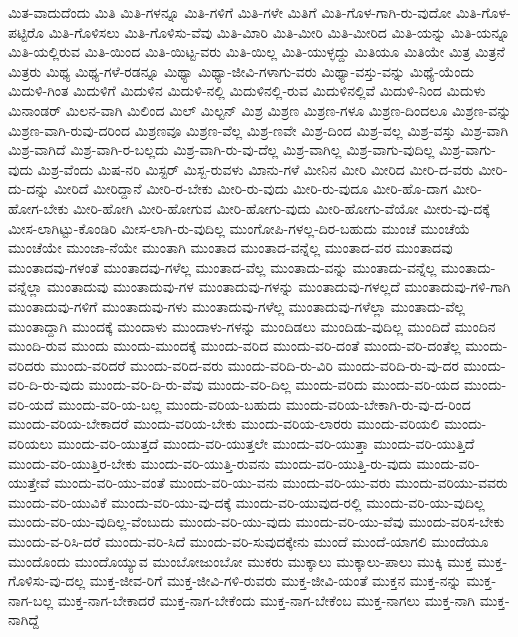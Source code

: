 {ಮಿತ-ವಾದುದೆಂದು
ಮಿತಿ
ಮಿತಿ-ಗಳನ್ನೂ
ಮಿತಿ-ಗಳಿಗೆ
ಮಿತಿ-ಗಳೇ
ಮಿತಿಗೆ
ಮಿತಿ-ಗೊಳ-ಗಾಗಿ-ರು-ವುದೋ
ಮಿತಿ-ಗೊಳ-ಪಟ್ಟಿರೊ
ಮಿತಿ-ಗೊಳಿಸಲು
ಮಿತಿ-ಗೊಳಿಸು-ವೆವು
ಮಿತಿ-ಮಿಾರಿ
ಮಿತಿ-ಮೀರಿ
ಮಿತಿ-ಮೀರಿದ
ಮಿತಿ-ಯನ್ನು
ಮಿತಿ-ಯನ್ನೂ
ಮಿತಿ-ಯಲ್ಲಿರುವ
ಮಿತಿ-ಯಿಂದ
ಮಿತಿ-ಯಿಟ್ಟ-ವರು
ಮಿತಿ-ಯಿಲ್ಲ
ಮಿತಿ-ಯುಳ್ಳದ್ದು
ಮಿತಿಯೂ
ಮಿತಿಯೇ
ಮಿತ್ರ
ಮಿತ್ರನೆ
ಮಿತ್ರರು
ಮಿಥ್ಯ
ಮಿಥ್ಯ-ಗಳೆ-ರಡನ್ನೂ
ಮಿಥ್ಯಾ
ಮಿಥ್ಯಾ-ಜೀವಿ-ಗಳಾಗು-ವರು
ಮಿಥ್ಯಾ-ವಸ್ತು-ವನ್ನು
ಮಿಥ್ಯೆ-ಯೆಂದು
ಮಿದುಳಿ-ಗಿಂತ
ಮಿದುಳಿಗೆ
ಮಿದುಳಿನ
ಮಿದುಳಿ-ನಲ್ಲಿ
ಮಿದುಳಿನಲ್ಲಿ-ರುವ
ಮಿದುಳಿನಲ್ಲಿವೆ
ಮಿದುಳಿ-ನಿಂದ
ಮಿದುಳು
ಮಿನಾಂಡರ್
ಮಿಲನ-ವಾಗಿ
ಮಿಲಿಂದ
ಮಿಲ್
ಮಿಲ್ಟನ್
ಮಿಶ್ರ
ಮಿಶ್ರಣ
ಮಿಶ್ರಣ-ಗಳೂ
ಮಿಶ್ರಣ-ದಿಂದಲೂ
ಮಿಶ್ರಣ-ವನ್ನು
ಮಿಶ್ರಣ-ವಾಗಿ-ರುವು-ದರಿಂದ
ಮಿಶ್ರಣವೂ
ಮಿಶ್ರಣ-ವೆಲ್ಲ
ಮಿಶ್ರ-ಣವೇ
ಮಿಶ್ರ-ದಿಂದ
ಮಿಶ್ರ-ವಲ್ಲ
ಮಿಶ್ರ-ವಸ್ತು
ಮಿಶ್ರ-ವಾಗಿ
ಮಿಶ್ರ-ವಾಗಿದೆ
ಮಿಶ್ರ-ವಾಗಿ-ರ-ಬಲ್ಲದು
ಮಿಶ್ರ-ವಾಗಿ-ರು-ವು-ದೆಲ್ಲ
ಮಿಶ್ರ-ವಾಗಿಲ್ಲ
ಮಿಶ್ರ-ವಾಗು-ವುದಿಲ್ಲ
ಮಿಶ್ರ-ವಾಗು-ವುದು
ಮಿಶ್ರ-ವೆಂದು
ಮಿಷ-ನರಿ
ಮಿಸ್ಟರ್
ಮಿಸ್ಬ-ರುವಳು
ಮಿಾನು-ಗಳೆ
ಮೀನಿನ
ಮೀರಿ
ಮೀರಿದ
ಮೀರಿ-ದ-ವರು
ಮೀರಿ-ದು-ದನ್ನು
ಮೀರಿದೆ
ಮೀರಿದ್ದಾನೆ
ಮೀರಿ-ರ-ಬೇಕು
ಮೀರಿ-ರು-ವುದು
ಮೀರಿ-ರು-ವುದೂ
ಮೀರಿ-ಹೊ-ದಾಗ
ಮೀರಿ-ಹೋಗ-ಬೇಕು
ಮೀರಿ-ಹೋಗಿ
ಮೀರಿ-ಹೋಗುವ
ಮೀರಿ-ಹೋಗು-ವುದು
ಮೀರಿ-ಹೋಗು-ವೆಯೋ
ಮೀರು-ವು-ದಕ್ಕೆ
ಮೀಸ-ಲಾಗಿಟ್ಟು-ಕೊಂಡಿರಿ
ಮೀಸ-ಲಾಗಿ-ರು-ವುದಿಲ್ಲ
ಮುಂಗೋಪಿ-ಗಳಲ್ಲ-ದಿರ-ಬಹುದು
ಮುಂಚೆ
ಮುಂಚೆಯೆ
ಮುಂಚೆಯೇ
ಮುಂಜಾ-ನೆಯೇ
ಮುಂತಾಗಿ
ಮುಂತಾದ
ಮುಂತಾದ-ವನ್ನೆಲ್ಲ
ಮುಂತಾದ-ವರ
ಮುಂತಾದವು
ಮುಂತಾದವು-ಗಳಂತೆ
ಮುಂತಾದವು-ಗಳೆಲ್ಲ
ಮುಂತಾದ-ವೆಲ್ಲ
ಮುಂತಾದು-ವನ್ನು
ಮುಂತಾದು-ವನ್ನೆಲ್ಲ
ಮುಂತಾದು-ವನ್ನೆಲ್ಲಾ
ಮುಂತಾದುವು
ಮುಂತಾದುವು-ಗಳ
ಮುಂತಾದುವು-ಗಳನ್ನು
ಮುಂತಾದುವು-ಗಳಲ್ಲದೆ
ಮುಂತಾದುವು-ಗಳಿ-ಗಾಗಿ
ಮುಂತಾದುವು-ಗಳಿಗೆ
ಮುಂತಾದುವು-ಗಳು
ಮುಂತಾದುವು-ಗಳೆಲ್ಲ
ಮುಂತಾದುವು-ಗಳೆಲ್ಲಾ
ಮುಂತಾದು-ವೆಲ್ಲ
ಮುಂತಾದ್ದಾಗಿ
ಮುಂದಕ್ಕೆ
ಮುಂದಾಳು
ಮುಂದಾಳು-ಗಳನ್ನು
ಮುಂದಿಡಲು
ಮುಂದಿಡು-ವುದಿಲ್ಲ
ಮುಂದಿದೆ
ಮುಂದಿನ
ಮುಂದಿ-ರುವ
ಮುಂದು
ಮುಂದು-ಮುಂದಕ್ಕೆ
ಮುಂದು-ವರಿದ
ಮುಂದು-ವರಿ-ದಂತೆ
ಮುಂದು-ವರಿ-ದಂತೆಲ್ಲ
ಮುಂದು-ವರಿದರು
ಮುಂದು-ವರಿದರೆ
ಮುಂದು-ವರಿದ-ವರು
ಮುಂದು-ವರಿದಿ-ರು-ವಿರಿ
ಮುಂದು-ವರಿದಿ-ರು-ವು-ದರ
ಮುಂದು-ವರಿ-ದಿ-ರು-ವುದು
ಮುಂದು-ವರಿ-ದಿ-ರು-ವೆವು
ಮುಂದು-ವರಿ-ದಿಲ್ಲ
ಮುಂದು-ವರಿದು
ಮುಂದು-ವರಿ-ಯದ
ಮುಂದು-ವರಿ-ಯದೆ
ಮುಂದು-ವರಿ-ಯ-ಬಲ್ಲ
ಮುಂದು-ವರಿಯ-ಬಹುದು
ಮುಂದು-ವರಿಯ-ಬೇಕಾಗಿ-ರು-ವು-ದ-ರಿಂದ
ಮುಂದು-ವರಿಯ-ಬೇಕಾದರೆ
ಮುಂದು-ವರಿಯ-ಬೇಕು
ಮುಂದು-ವರಿಯ-ಲಾರರು
ಮುಂದು-ವರಿಯಲಿ
ಮುಂದು-ವರಿಯಲು
ಮುಂದು-ವರಿ-ಯುತ್ತದೆ
ಮುಂದು-ವರಿ-ಯುತ್ತಲೇ
ಮುಂದು-ವರಿ-ಯುತ್ತಾ
ಮುಂದು-ವರಿ-ಯುತ್ತಿದೆ
ಮುಂದು-ವರಿ-ಯುತ್ತಿರ-ಬೇಕು
ಮುಂದು-ವರಿ-ಯುತ್ತಿ-ರುವನು
ಮುಂದು-ವರಿ-ಯುತ್ತಿ-ರು-ವುದು
ಮುಂದು-ವರಿ-ಯುತ್ತೇವೆ
ಮುಂದು-ವರಿ-ಯು-ವಂತೆ
ಮುಂದು-ವರಿ-ಯು-ವನು
ಮುಂದು-ವರಿ-ಯು-ವರು
ಮುಂದು-ವರಿಯು-ವವರು
ಮುಂದು-ವರಿ-ಯುವಿಕೆ
ಮುಂದು-ವರಿ-ಯು-ವು-ದಕ್ಕೆ
ಮುಂದು-ವರಿ-ಯುವುದ-ರಲ್ಲಿ
ಮುಂದು-ವರಿ-ಯು-ವುದಿಲ್ಲ
ಮುಂದು-ವರಿ-ಯು-ವುದಿಲ್ಲ-ವೆಂಬುದು
ಮುಂದು-ವರಿ-ಯು-ವುದು
ಮುಂದು-ವರಿ-ಯು-ವೆವು
ಮುಂದು-ವರಿಸ-ಬೇಕು
ಮುಂದು-ವ-ರಿಸಿ-ದರೆ
ಮುಂದು-ವರಿ-ಸಿದೆ
ಮುಂದು-ವರಿ-ಸುವುದಕ್ಕೇನು
ಮುಂದೆ
ಮುಂದೆ-ಯಾಗಲಿ
ಮುಂದೆಯೂ
ಮುಂದೊಂದು
ಮುಂದೊಯ್ಯುವ
ಮುಂಬೋಜುಂಬೋ
ಮುಕರು
ಮುಕ್ಕಾಲು
ಮುಕ್ಕಾಲು-ಪಾಲು
ಮುಕ್ಕಿ
ಮುಕ್ತ
ಮುಕ್ತ-ಗೊಳಿಸು-ವು-ದಲ್ಲ
ಮುಕ್ತ-ಜೀವ-ರಿಗೆ
ಮುಕ್ತ-ಜೀವಿ-ಗಳಿ-ರುವರು
ಮುಕ್ತ-ಜೀವಿ-ಯಂತೆ
ಮುಕ್ತನ
ಮುಕ್ತ-ನನ್ನು
ಮುಕ್ತ-ನಾಗ-ಬಲ್ಲ
ಮುಕ್ತ-ನಾಗ-ಬೇಕಾದರೆ
ಮುಕ್ತ-ನಾಗ-ಬೇಕೆಂದು
ಮುಕ್ತ-ನಾಗ-ಬೇಕೆಂಬ
ಮುಕ್ತ-ನಾಗಲು
ಮುಕ್ತ-ನಾಗಿ
ಮುಕ್ತ-ನಾಗಿದ್ದೆ
}
